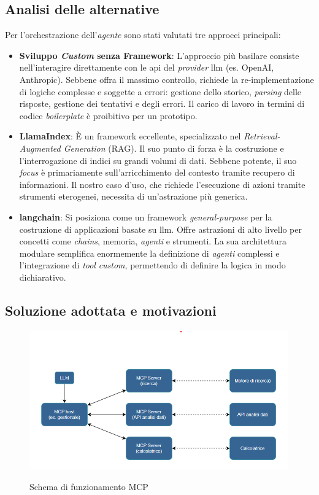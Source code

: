 \subsection{Analisi delle alternative}
Per l'orchestrazione dell'\textit{agente} sono stati valutati tre approcci principali:
\begin{itemize}
    \item \textbf{Sviluppo \textit{Custom} senza Framework}: L'approccio più basilare consiste nell'interagire direttamente con le \gls{api} del \textit{provider} \gls{llm} (es. OpenAI, Anthropic). Sebbene offra il massimo controllo, richiede la re-implementazione di logiche complesse e soggette a errori: gestione dello storico, \textit{parsing} delle risposte, gestione dei tentativi e degli errori. Il carico di lavoro in termini di codice \textit{boilerplate} è proibitivo per un prototipo.
    
    \item \textbf{LlamaIndex}: È un \gls{framework} eccellente, specializzato nel \textit{Retrieval-Augmented Generation} (RAG). Il suo punto di forza è la costruzione e l'interrogazione di indici su grandi volumi di dati. Sebbene potente, il suo \textit{focus} è primariamente sull'arricchimento del contesto tramite recupero di informazioni. Il nostro caso d'uso, che richiede l'esecuzione di azioni tramite strumenti eterogenei, necessita di un'astrazione più generica.
    
    \item \textbf{\gls{langchain}}: Si posiziona come un \gls{framework} \textit{general-purpose} per la costruzione di applicazioni basate su \gls{llm}. Offre astrazioni di alto livello per concetti come \textit{chains}, memoria, \textit{agenti} e strumenti. La sua architettura modulare semplifica enormemente la definizione di \textit{agenti} complessi e l'integrazione di \textit{tool} \textit{custom}, permettendo di definire la logica in modo dichiarativo.
\end{itemize}

\subsection{Soluzione adottata e motivazioni}
\begin{figure}[H]
    \centering
    \includegraphics[alt={Schema funzionamento MCP}, height=6cm]{img/schemaMCP.png}
    \caption{Schema di funzionamento MCP}
    \label{fig:schemaMCP}
\end{figure}

